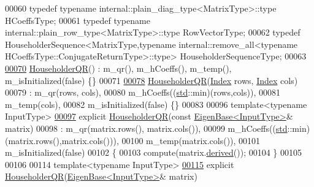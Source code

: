 \begin{DoxyCode}
00060     \textcolor{keyword}{typedef} \textcolor{keyword}{typename} internal::plain\_diag\_type<MatrixType>::type HCoeffsType;
00061     \textcolor{keyword}{typedef} \textcolor{keyword}{typename} internal::plain\_row\_type<MatrixType>::type RowVectorType;
00062     \textcolor{keyword}{typedef} HouseholderSequence<MatrixType,typename internal::remove\_all<typename
       HCoeffsType::ConjugateReturnType>::type> HouseholderSequenceType;
00063 
\hyperlink{group___q_r___module_a974adb10a0e066057aeb3b360df68380}{00070}     \hyperlink{group___q_r___module_a974adb10a0e066057aeb3b360df68380}{HouseholderQR}() : m\_qr(), m\_hCoeffs(), m\_temp(), m\_isInitialized(false) \{\}
00071 
\hyperlink{group___q_r___module_a1087457610c53e1574de521a51de0cd3}{00078}     \hyperlink{group___q_r___module_a1087457610c53e1574de521a51de0cd3}{HouseholderQR}(\hyperlink{namespace_eigen_a62e77e0933482dafde8fe197d9a2cfde}{Index} rows, \hyperlink{namespace_eigen_a62e77e0933482dafde8fe197d9a2cfde}{Index} cols)
00079       : m\_qr(rows, cols),
00080         m\_hCoeffs((\hyperlink{namespacestd}{std}::min)(rows,cols)),
00081         m\_temp(cols),
00082         m\_isInitialized(false) \{\}
00083 
00096     \textcolor{keyword}{template}<\textcolor{keyword}{typename} InputType>
\hyperlink{group___q_r___module_afa7cfb4faa89195c4dc8d196924c8230}{00097}     \textcolor{keyword}{explicit} \hyperlink{group___q_r___module_afa7cfb4faa89195c4dc8d196924c8230}{HouseholderQR}(\textcolor{keyword}{const} \hyperlink{group___core___module_struct_eigen_1_1_eigen_base}{EigenBase<InputType>}& matrix)
00098       : m\_qr(matrix.rows(), matrix.cols()),
00099         m\_hCoeffs((\hyperlink{namespacestd}{std}::min)(matrix.rows(),matrix.cols())),
00100         m\_temp(matrix.cols()),
00101         m\_isInitialized(false)
00102     \{
00103       compute(matrix.\hyperlink{group___core___module_a324b16961a11d2ecfd2d1b7dd7946545}{derived}());
00104     \}
00105 
00106 
00114     \textcolor{keyword}{template}<\textcolor{keyword}{typename} InputType>
\hyperlink{group___q_r___module_a95a53f8479ee147d7b0ccab71c13e45d}{00115}     \textcolor{keyword}{explicit} \hyperlink{group___q_r___module_a95a53f8479ee147d7b0ccab71c13e45d}{HouseholderQR}(\hyperlink{group___core___module_struct_eigen_1_1_eigen_base}{EigenBase<InputType>}& matrix)

\end{DoxyCode}
